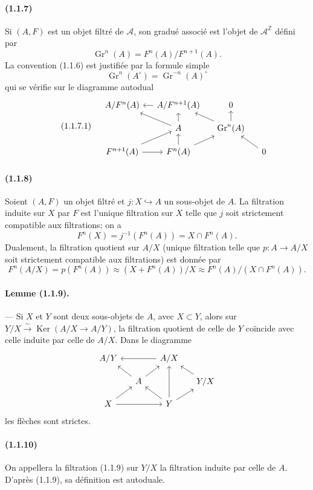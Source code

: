 \documentclass[10pt]{article}
\newcommand{\Z}{\mathbb Z}
\newcommand{\Gr}{\operatorname{Gr}}
\newcommand{\Ker}{\operatorname{Ker}}
\newcommand{\calA}{\mathcal A}
\newcommand{\iso}{\xrightarrow{\sim}}
\begin{document}
\paragraph{(1.1.7)} Si $(A,F)$ est un objet filtré de $\calA$, son gradué associé est l'objet de $\calA^{\Z}$ défini par
\[
\Gr^n(A)=F^n(A)/F^{n+1}(A).
\]
La convention (1.1.6) est justifiée par la formule simple
\[
\Gr^n(A^{\circ})=\Gr^{-n}(A)^{\circ}
\]
qui se vérifie sur le diagramme autodual
\begin{equation}\tag{1.1.7.1}
\begin{tikzcd}[column sep=1.2em,row sep=1.0em]
& A/F^n(A) & A/F^{n+1}(A) \arrow[l] & 0 \\
& & A \arrow[ul] \arrow[u] & \Gr^n(A) \arrow[ul] \arrow[u] \\
& F^{n+1}(A) \arrow[r] \arrow[ur] & F^n(A) \arrow[u] \arrow[ur] & & 0 \arrow[ul]
\end{tikzcd}
\end{equation}

\paragraph{(1.1.8)} Soient $(A,F)$ un objet filtré et $j:X\hookrightarrow A$ un sous-objet de $A$. La filtration induite sur $X$ par $F$ est l'unique filtration sur $X$ telle que $j$ soit strictement compatible aux filtrations; on a
\[
F^n(X)=j^{-1}(F^n(A))=X\cap F^n(A).
\]
Dualement, la filtration quotient sur $A/X$ (unique filtration telle que $p:A\to A/X$ soit strictement compatible aux filtrations) est donnée par
\[
F^n(A/X)=p(F^n(A))\approx (X+F^n(A))/X\approx F^n(A)/(X\cap F^n(A)).
\]

\paragraph{Lemme (1.1.9).} --- Si $X$ et $Y$ sont deux sous-objets de $A$, avec $X\subset Y$, alors sur $Y/X\iso\Ker(A/X\to A/Y)$, la filtration quotient de celle de $Y$ coïncide avec celle induite par celle de $A/X$. Dans le diagramme
\[
\begin{tikzcd}[column sep=1.3em,row sep=1.0em]
A/Y && A/X \arrow[ll] & \\
& A \arrow[ul] \arrow[ur] && Y/X \arrow[ul] \\
X \arrow[ur] \arrow[rr] && Y \arrow[ul] \arrow[uu] \arrow[ur] &
\end{tikzcd}
\]
les flèches sont strictes.

\paragraph{(1.1.10)} On appellera la filtration (1.1.9) sur $Y/X$ la filtration induite par celle de $A$. D'après (1.1.9), sa définition est autoduale.
\end{document}
